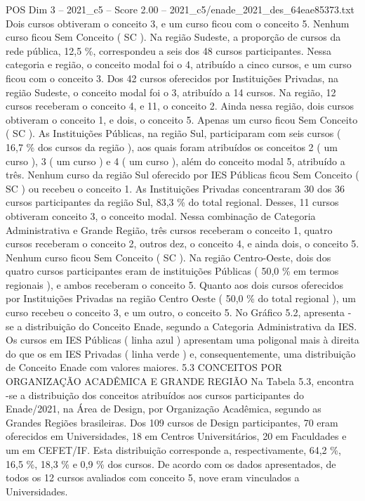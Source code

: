 \begin{textsample}{POS Dim 3 – 2021\_c5 – Score 2.00 – 2021\_c5/enade\_2021\_des\_64eae85373.txt}
Dois cursos obtiveram o conceito 3, e um curso ficou com o conceito 5.
Nenhum curso ficou Sem Conceito ( SC ).
Na região Sudeste, a proporção de cursos da rede pública, 12,5 \%, correspondeu a seis dos 48 cursos participantes.
Nessa categoria e região, o conceito modal foi o 4, atribuído a cinco cursos, e um curso ficou com o conceito 3.
Dos 42 cursos oferecidos por Instituições Privadas, na região Sudeste, o conceito modal foi o 3, atribuído a 14 cursos.
Na região, 12 cursos receberam o conceito 4, e 11, o conceito 2.
Ainda nessa região, dois cursos obtiveram o conceito 1, e dois, o conceito 5.
Apenas um curso ficou Sem Conceito ( SC ).
As Instituições Públicas, na região Sul, participaram com seis cursos ( 16,7 \% dos cursos da região ), aos quais foram atribuídos os conceitos 2 ( um curso ), 3 ( um curso ) e 4 ( um curso ), além do conceito modal 5, atribuído a três.
Nenhum curso da região Sul oferecido por IES Públicas ficou Sem Conceito ( SC ) ou recebeu o conceito 1.
As Instituições Privadas concentraram 30 dos 36 cursos participantes da região Sul, 83,3 \% do total regional.
Desses, 11 cursos obtiveram conceito 3, o conceito modal.
Nessa combinação de Categoria Administrativa e Grande Região, três cursos receberam o conceito 1, quatro cursos receberam o conceito 2, outros dez, o conceito 4, e ainda dois, o conceito 5.
Nenhum curso ficou Sem Conceito ( SC ).
Na região Centro-Oeste, dois dos quatro cursos participantes eram de instituições Públicas ( 50,0 \% em termos regionais ), e ambos receberam o conceito 5.
Quanto aos dois cursos oferecidos por Instituições Privadas na região Centro Oeste ( 50,0 \% do total regional ), um curso recebeu o conceito 3, e um outro, o conceito 5.
No Gráfico 5.2, apresenta -se a distribuição do Conceito Enade, segundo a Categoria Administrativa da IES.
Os cursos em IES Públicas ( linha azul ) apresentam uma poligonal mais à direita do que os em IES Privadas ( linha verde ) e, consequentemente, uma distribuição de Conceito Enade com valores maiores. 5.3 CONCEITOS POR ORGANIZAÇÃO ACADÊMICA E GRANDE REGIÃO Na Tabela 5.3, encontra -se a distribuição dos conceitos atribuídos aos cursos participantes do Enade/2021, na Área de Design, por Organização Acadêmica, segundo as Grandes Regiões brasileiras.
Dos 109 cursos de Design participantes, 70 eram oferecidos em Universidades, 18 em Centros Universitários, 20 em Faculdades e um em CEFET/IF.
Esta distribuição corresponde a, respectivamente, 64,2 \%, 16,5 \%, 18,3 \% e 0,9 \% dos cursos.
De acordo com os dados apresentados, de todos os 12 cursos avaliados com conceito 5, nove eram vinculados a Universidades.

\end{textsample}
